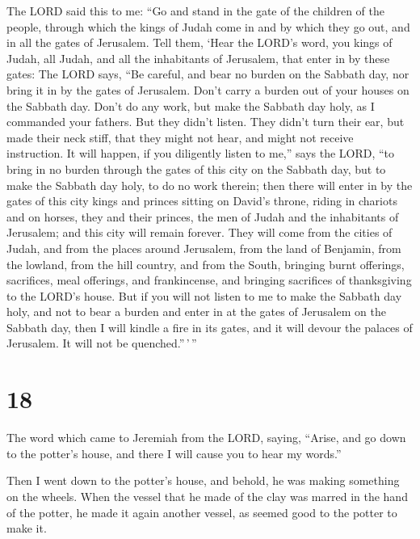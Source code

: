  The LORD said this to me: ``Go and stand in the gate of
the children of the people, through which the kings of Judah come in and
by which they go out, and in all the gates of Jerusalem. 
Tell them, `Hear the LORD's word, you kings of Judah, all Judah, and all
the inhabitants of Jerusalem, that enter in by these gates:
 The LORD says, ``Be careful, and bear no burden on the
Sabbath day, nor bring it in by the gates of Jerusalem. 
Don't carry a burden out of your houses on the Sabbath day. Don't do any
work, but make the Sabbath day holy, as I commanded your fathers.
 But they didn't listen. They didn't turn their ear, but
made their neck stiff, that they might not hear, and might not receive
instruction.  It will happen, if you diligently listen to
me,'' says the LORD, ``to bring in no burden through the gates of this
city on the Sabbath day, but to make the Sabbath day holy, to do no work
therein;  then there will enter in by the gates of this
city kings and princes sitting on David's throne, riding in chariots and
on horses, they and their princes, the men of Judah and the inhabitants
of Jerusalem; and this city will remain forever.  They will
come from the cities of Judah, and from the places around Jerusalem,
from the land of Benjamin, from the lowland, from the hill country, and
from the South, bringing burnt offerings, sacrifices, meal offerings,
and frankincense, and bringing sacrifices of thanksgiving to the LORD's
house.  But if you will not listen to me to make the
Sabbath day holy, and not to bear a burden and enter in at the gates of
Jerusalem on the Sabbath day, then I will kindle a fire in its gates,
and it will devour the palaces of Jerusalem. It will not be
quenched.''\,'\,''

\hypertarget{section-17}{%
\section{18}\label{section-17}}

 The word which came to Jeremiah from the LORD, saying,
 ``Arise, and go down to the potter's house, and there I
will cause you to hear my words.''

 Then I went down to the potter's house, and behold, he was
making something on the wheels.  When the vessel that he
made of the clay was marred in the hand of the potter, he made it again
another vessel, as seemed good to the potter to make it.

